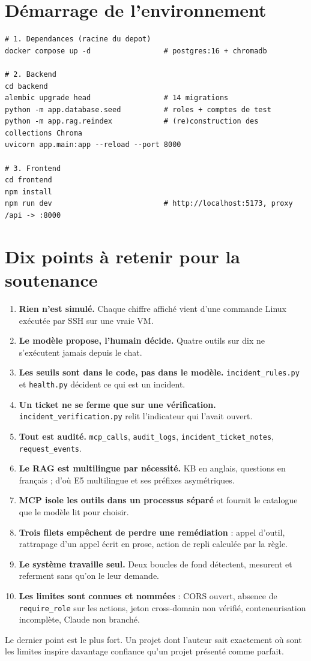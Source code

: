 \documentclass[11pt,a4paper]{report}
\newcommand{\file}[1]{\texttt{\small #1}}
\newcommand{\fn}[1]{\texttt{\small\textcolor{oasisviolet}{#1}}}
\newcommand{\tbl}[1]{\texttt{\small\textcolor{oasisamber}{#1}}}
\begin{document}
\section{Démarrage de l'environnement}

\begin{lstlisting}[caption={Séquence complète, d'après le code et .claude/launch.json}]
# 1. Dependances (racine du depot)
docker compose up -d                 # postgres:16 + chromadb

# 2. Backend
cd backend
alembic upgrade head                 # 14 migrations
python -m app.database.seed          # roles + comptes de test
python -m app.rag.reindex            # (re)construction des collections Chroma
uvicorn app.main:app --reload --port 8000

# 3. Frontend
cd frontend
npm install
npm run dev                          # http://localhost:5173, proxy /api -> :8000
\end{lstlisting}

\section{Dix points à retenir pour la soutenance}

\begin{enumerate}
  \item \textbf{Rien n'est simulé.} Chaque chiffre affiché vient d'une commande
  Linux exécutée par SSH sur une vraie VM.
  \item \textbf{Le modèle propose, l'humain décide.} Quatre outils sur dix ne
  s'exécutent jamais depuis le chat.
  \item \textbf{Les seuils sont dans le code, pas dans le modèle.}
  \file{incident\_rules.py} et \file{health.py} décident ce qui est un incident.
  \item \textbf{Un ticket ne se ferme que sur une vérification.}
  \file{incident\_verification.py} relit l'indicateur qui l'avait ouvert.
  \item \textbf{Tout est audité.} \tbl{mcp\_calls}, \tbl{audit\_logs},
  \tbl{incident\_ticket\_notes}, \tbl{request\_events}.
  \item \textbf{Le RAG est multilingue par nécessité.} KB en anglais, questions
  en français ; d'où E5 multilingue et ses préfixes asymétriques.
  \item \textbf{MCP isole les outils dans un processus séparé} et fournit le
  catalogue que le modèle lit pour choisir.
  \item \textbf{Trois filets empêchent de perdre une remédiation} : appel
  d'outil, rattrapage d'un appel écrit en prose, action de repli calculée par la
  règle.
  \item \textbf{Le système travaille seul.} Deux boucles de fond détectent,
  mesurent et referment sans qu'on le leur demande.
  \item \textbf{Les limites sont connues et nommées} : CORS ouvert, absence de
  \fn{require\_role} sur les actions, jeton cross-domain non vérifié,
  conteneurisation incomplète, Claude non branché.
\end{enumerate}

\begin{keybox}
Le dernier point est le plus fort. Un projet dont l'auteur sait exactement où
sont les limites inspire davantage confiance qu'un projet présenté comme
parfait.
\end{keybox}
\end{document}
